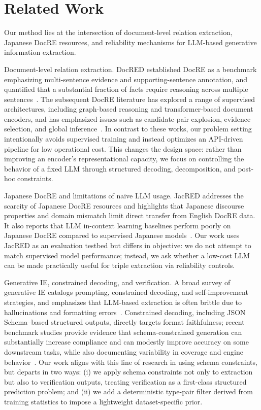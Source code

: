 \documentclass{article} %
\begin{document}
\section{Related Work}\label{sec:related}
Our method lies at the intersection of document-level relation extraction, Japanese DocRE resources, and reliability mechanisms for LLM-based generative information extraction.

Document-level relation extraction. DocRED established DocRE as a benchmark emphasizing multi-sentence evidence and supporting-sentence annotation, and quantified that a substantial fraction of facts require reasoning across multiple sentences~\cite{yao-2019-docred}. The subsequent DocRE literature has explored a range of supervised architectures, including graph-based reasoning and transformer-based document encoders, and has emphasized issues such as candidate-pair explosion, evidence selection, and global inference~\cite{delaunay-2023-comprehensive}. In contrast to these works, our problem setting intentionally avoids supervised training and instead optimizes an API-driven pipeline for low operational cost. This changes the design space: rather than improving an encoder’s representational capacity, we focus on controlling the behavior of a fixed LLM through structured decoding, decomposition, and post-hoc constraints.

Japanese DocRE and limitations of naive LLM usage. JacRED addresses the scarcity of Japanese DocRE resources and highlights that Japanese discourse properties and domain mismatch limit direct transfer from English DocRE data. It also reports that LLM in-context learning baselines perform poorly on Japanese DocRE compared to supervised Japanese models~\cite{ma-2024-building}. Our work uses JacRED as an evaluation testbed but differs in objective: we do not attempt to match supervised model performance; instead, we ask whether a low-cost LLM can be made practically useful for triple extraction via reliability controls.

Generative IE, constrained decoding, and verification. A broad survey of generative IE catalogs prompting, constrained decoding, and self-improvement strategies, and emphasizes that LLM-based extraction is often brittle due to hallucinations and formatting errors~\cite{xu-2023-large}. Constrained decoding, including JSON Schema–based structured outputs, directly targets format faithfulness; recent benchmark studies provide evidence that schema-constrained generation can substantially increase compliance and can modestly improve accuracy on some downstream tasks, while also documenting variability in coverage and engine behavior~\cite{geng-2025-generating}. Our work aligns with this line of research in using schema constraints, but departs in two ways: (i) we apply schema constraints not only to extraction but also to verification outputs, treating verification as a first-class structured prediction problem; and (ii) we add a deterministic type-pair filter derived from training statistics to impose a lightweight dataset-specific prior.
\end{document}
